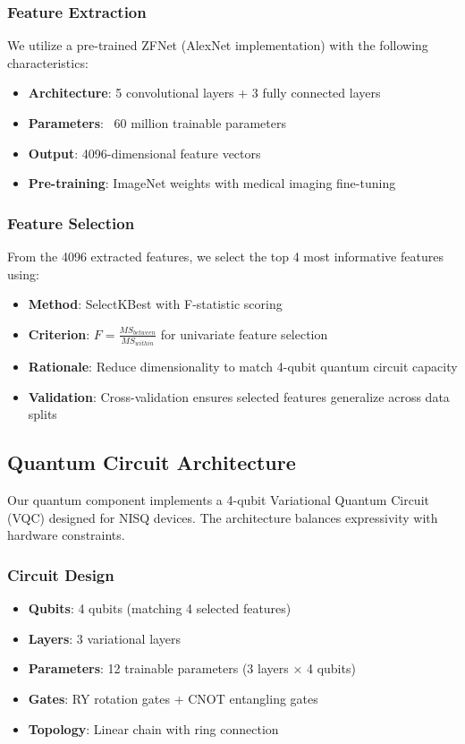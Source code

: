 \documentclass[conference]{IEEEtran}
\begin{document}
\subsubsection{Feature Extraction}
We utilize a pre-trained ZFNet (AlexNet implementation) with the following characteristics:
\begin{itemize}
    \item \textbf{Architecture}: 5 convolutional layers + 3 fully connected layers
    \item \textbf{Parameters}: ~60 million trainable parameters
    \item \textbf{Output}: 4096-dimensional feature vectors
    \item \textbf{Pre-training}: ImageNet weights with medical imaging fine-tuning
\end{itemize}

\subsubsection{Feature Selection}
From the 4096 extracted features, we select the top 4 most informative features using:
\begin{itemize}
    \item \textbf{Method}: SelectKBest with F-statistic scoring
    \item \textbf{Criterion}: $F = \frac{MS_{between}}{MS_{within}}$ for univariate feature selection
    \item \textbf{Rationale}: Reduce dimensionality to match 4-qubit quantum circuit capacity
    \item \textbf{Validation}: Cross-validation ensures selected features generalize across data splits
\end{itemize}

\subsection{Quantum Circuit Architecture}

Our quantum component implements a 4-qubit Variational Quantum Circuit (VQC) designed for NISQ devices. The architecture balances expressivity with hardware constraints.

\subsubsection{Circuit Design}
\begin{itemize}
    \item \textbf{Qubits}: 4 qubits (matching 4 selected features)
    \item \textbf{Layers}: 3 variational layers
    \item \textbf{Parameters}: 12 trainable parameters (3 layers × 4 qubits)
    \item \textbf{Gates}: RY rotation gates + CNOT entangling gates
    \item \textbf{Topology}: Linear chain with ring connection
\end{itemize}
\end{document}
